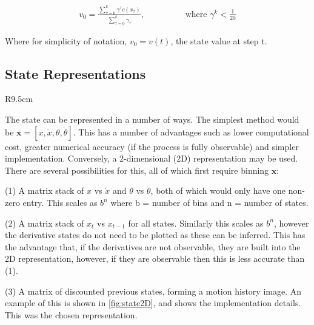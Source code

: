 \documentclass[../main.tex]{subfiles}
\begin{document}
\begin{align}
   v_0 = \frac{\sum_{\tau=0}^{k} \gamma^\tau c(x_\tau ) }{\sum_{\tau = 0}^k \gamma_\tau}, \hspace{2cm} \text{where } \gamma^k < \frac{1}{20}
\end{align}

Where for simplicity of notation, $v_0 = v(t)$, the state value at step t.

\subsection{State Representations}

\begin{wrapfigure}{R}{9.5cm}
   \label{fig:state2D}
\end{wrapfigure}

The state can be represented in a number of ways. The simplest method would be $\boldsymbol{x} = [x, \dot{x}, \theta, \dot{\theta}]$. This has a number of advantages such as lower computational cost, greater numerical accuracy (if the process is fully observable) and simpler implementation. Conversely, a 2-dimensional (2D) representation may be used. There are several possibilities for this, all of which first require binning $\boldsymbol{x}$:

(1) A matrix stack of $x$ vs $\dot{x}$ and $\theta$ vs $\dot{\theta}$, both of which would only have one non-zero entry. This scales as $b^n$ where b = number of bins and n = number of states.

(2) A matrix stack of $x_t$ vs $x_{t-1}$ for all states. Similarly this scales as $b^n$, however the derivative states do not need to be plotted as these can be inferred. This has the advantage that, if the derivatives are not observable, they are built into the 2D representation, however, if they are observable then this is less accurate than (1).

(3) A matrix of discounted previous states, forming a motion history image. An example of this is shown in \cref{fig:state2D},  and  shows the implementation details. This was the chosen representation.
\end{document}
